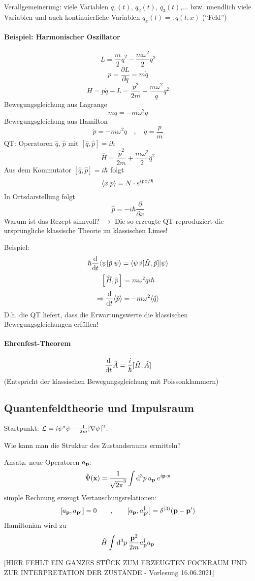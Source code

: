 \documentclass[11pt,a4paper]{report}
\begin{document}
Verallgemeinerung: viele Variablen $q_1(t)$, $q_2(t)$, $q_3(t)$,... bzw. unendlich viele Variablen und auch kontinuierliche Variablen $q_x(t)=: q(t,x)$ (``Feld'')

\paragraph{Beispiel: Harmonischer Oszillator}

$$L=\frac{m}{2}\dot{q}^2 - \frac{m\omega^2}{2}q^2$$
$$p = \frac{\partial L}{\partial \dot{q}} = m\dot{q}$$
$$H=p\dot{q} -L = \frac{p^2}{2m}+\frac{m\omega^2}{q}q^2$$
Bewegungsgleichung aus Lagrange
$$m\ddot{q}=-m\omega^2q$$
Bewegungsgleichung aus Hamilton
$$\dot{p}=-m\omega^2q\quad , \quad \dot{q}=\frac{p}{m}$$
QT: Operatoren $\hat{q}$, $\hat{p}$ mit $[\hat{q},\hat{p}]=i\hbar$
$$\hat{H}=\frac{\hat{p}^2}{2m}+\frac{m\omega^2}{2}\hat{q}^2$$
Aus dem Kommutator $[\hat{q},\hat{p}]=i\hbar$ folgt
$$\langle x | p \rangle=N\cdot e^{ipx/\hbar }$$
In Ortsdarstellung folgt
$$\hat{p}=-i\hbar\frac{\partial}{\partial x}$$
Warum ist das Rezept sinnvoll? $\rightarrow$ Die so erzeugte QT reproduziert die ursprüngliche klassische Theorie im klassischen Limes!\par 

Beispiel:
$$\hbar\frac{\mathrm{d}}{\mathrm{d} t}\langle \psi|\hat{p}|\psi\rangle=\langle \psi|i[\hat{H},\hat{p}]|\psi\rangle$$
$$[\hat{H},\hat{p}]=m\omega^2\hat{q}i\hbar$$
$$\Rightarrow \frac{\mathrm{d}}{\mathrm{d} t}\langle \hat{p}\rangle = -m\omega^2\langle \hat{q}\rangle$$
D.h. die QT liefert, dass die Erwartungswerte die klassischen Bewegungsgleichungen erfüllen!\par 

\paragraph{Ehrenfest-Theorem}
$$\frac{\mathrm{d}}{\mathrm{d} t}\hat{A}=\frac{i}{\hbar}[\hat{H},\hat{A}]$$
(Entspricht der klassischen Bewegungsgleichung mit Poissonklammern)

\subsection{Quantenfeldtheorie und Impulsraum}

Startpunkt: $\mathcal{L} = i\psi^*\psi - \frac{1}{2m}|\nabla\psi |^2$.\par 

Wie kann man die Struktur des Zustandsraums ermitteln?\par 
Ansatz: neue Operatoren $a_{\mathbf{p}}$:
$$\hat{\Psi} (\mathbf{x})=\frac{1}{\sqrt{2\pi}^3}\int \mathrm{d}^3p \: a_{\mathbf{p}} \: e^{i\mathbf{p}\cdot\mathbf{x}}$$
simple Rechnung erzeugt Vertauschungsrelationen:
$$[a_{\mathbf{p}},a_{\mathbf{p}'}]=0\qquad ,\qquad [a_{\mathbf{p}},a^\dagger_{\mathbf{p}'}]=\delta^{(3)}(\mathbf{p}-\mathbf{p}')$$
Hamiltonian wird zu
$$\hat{H}\int\mathrm{d}^3p\:\frac{\mathbf{p}^2}{2m}a_{\mathbf{p}}^\dagger a_{\mathbf{p}}$$

[HIER FEHLT EIN GANZES STÜCK ZUM ERZEUGTEN FOCKRAUM UND ZUR INTERPRETATION DER ZUSTÄNDE - Vorlesung 16.06.2021]
\end{document}
